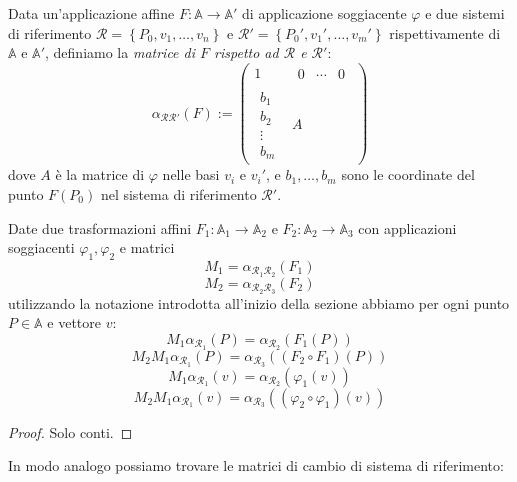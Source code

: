 \documentclass[11pt]{scrartcl}
\renewcommand{\AA}{\mathbb{A}}
\begin{document}
   	 \begin{definition}
   	 	Data un'applicazione affine $F:\mathbb{A}\to\mathbb{A}'$ di applicazione soggiacente $\varphi$ e due sistemi di riferimento $\mathcal{R}=\left\{P_0,v_1,\dots,v_n\right\}$ e $\mathcal{R}'=\left\{P_0',v_1',\dots,v_m'\right\}$ rispettivamente di $\mathbb{A}$ e $\mathbb{A}'$, definiamo la \textit{matrice di $F$ rispetto ad $\mathcal{R}$ e $\mathcal{R}'$}:
   	 	$$\alpha_{\mathcal{R}\mathcal{R}'}(F):=\left(\begin{array}{c|c}
   	 		1 & \begin{array}{ccc} 
   	 			0 & \cdots & 0
   	 		\end{array} \\
   	 		\hline
   	 		\begin{array}{c}
   	 			b_1 \\
   	 			b_2 \\
   	 			\vdots \\
   	 			b_m
   	 		\end{array} & A
   	 	\end{array}\right)$$
   	 	dove $A$ è la matrice di $\varphi$ nelle basi $v_i$ e $v_i'$, e $b_1,\dots,b_m$ sono le coordinate del punto $F(P_0)$ nel sistema di riferimento $\mathcal{R}'$.
   	 \end{definition}
   	 \begin{theorem}
   	 	Date due trasformazioni affini $F_1:\AA_1\to\AA_2$ e $F_2:\AA_2\to\AA_3$ con applicazioni soggiacenti $\varphi_1,\varphi_2$ e matrici
   	 	$$M_1=\alpha_{\mathcal{R}_1\mathcal{R}_2}(F_1)$$
   	 	$$M_2=\alpha_{\mathcal{R}_2\mathcal{R}_3}(F_2)$$
   	 	utilizzando la notazione introdotta all'inizio della sezione abbiamo per ogni punto $P\in \mathbb{A}$ e vettore $v$:
   	 	$$M_1\alpha_{\mathcal{R}_1}(P)=\alpha_{\mathcal{R}_2}(F_1(P))$$
   	 	$$M_2M_1\alpha_{\mathcal{R}_1}(P)=\alpha_{\mathcal{R}_3}((F_2\circ F_1)(P))$$ 
   	 	$$M_1\alpha_{\mathcal{R}_1}(v)=\alpha_{\mathcal{R}_2}(\varphi_1(v))$$
   	 	$$M_2M_1\alpha_{\mathcal{R}_1}(v)=\alpha_{\mathcal{R}_3}((\varphi_2\circ \varphi_1)(v))$$
   	 \end{theorem}
   	 \begin{proof}
   	 	Solo conti.
   	 \end{proof}
   	 In modo analogo possiamo trovare le matrici di cambio di sistema di riferimento:
\end{document}
